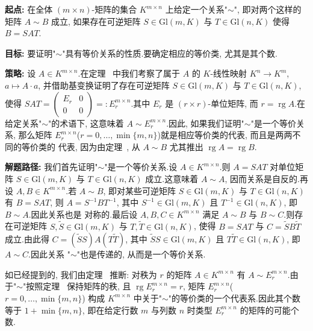 \noindent\textbf{起点:} 在全体 $(m \times n)$-矩阵的集合 $K^{m \times n}$ 上给定一个关系"$\sim$",
即对两个这样的矩阵 $A \sim B$ 成立, 如果存在可逆矩阵 $S \in \mathrm{Gl}(m, K)$ 与
$T \in \mathrm{Gl}(n, K)$ 使得 $B = SAT$.

\noindent\textbf{目标:} 要证明"$\sim$"具有等价关系的性质.要确定相应的等价类, 尤其是其个数.

\noindent\textbf{策略:} 设 $A \in K^{m \times n}$.在定理~ 中我们考察了属于 $A$ 的
$K$-线性映射 $K^n \longrightarrow K^m$, $a \longmapsto A \cdot a$, 并借助基变换证明了存在可逆矩阵
$S \in \mathrm{Gl}(m, K)$ 与 $T \in \mathrm{Gl}(n, K)$, 使得
$SAT = \begin{pmatrix} E_r & 0 \\ 0 & 0 \end{pmatrix} =: E_r^{m \times n}$.其中 $E_r$ 是
$(r \times r)$-单位矩阵, 而 $r = \operatorname{rg} A$.在给定关系"$\sim$"的术语下, 这意味着
$A \sim E_r^{m \times n}$.因此, 如果我们证明"$\sim$"是一个等价关系, 那么矩阵
$E_r^{m \times n}$($r = 0, \ldots, \min\{m, n\}$)就是相应等价类的代表, 而且是两两不同的等价类的
代表, 因为由定理~, 从 $A \sim B$ 尤其推出 $\operatorname{rg} A = \operatorname{rg} B$.

\noindent\textbf{解题路径:} 我们首先证明"$\sim$"是一个等价关系.设 $A \in K^{m \times n}$.则
$A = SAT$ 对单位矩阵 $S \in \mathrm{Gl}(m, K)$ 与 $T \in \mathrm{Gl}(n, K)$ 成立.这意味着
$A \sim A$, 因而关系是自反的.再设 $A, B \in K^{m \times n}$.若 $A \sim B$, 即对某些可逆矩阵
$S \in \mathrm{Gl}(m, K)$ 与 $T \in \mathrm{Gl}(n, K)$ 有 $B = SAT$, 则 $A = S^{-1}BT^{-1}$,
其中 $S^{-1} \in \mathrm{Gl}(m, K)$ 且 $T^{-1} \in \mathrm{Gl}(n, K)$, 即 $B \sim A$.因此关系也是
对称的.最后设 $A, B, C \in K^{m \times n}$ 满足 $A \sim B$ 与 $B \sim C$.则存在可逆矩阵
$S, \tilde{S} \in \mathrm{Gl}(m, K)$ 与 $T, \tilde{T} \in \mathrm{Gl}(n, K)$, 使得 $B = SAT$ 与
$C = \tilde{S}B\tilde{T}$ 成立.由此得 $C = (\tilde{S}S)A(T\tilde{T})$, 其中
$\tilde{S}S \in \mathrm{Gl}(m, K)$ 且 $T\tilde{T} \in \mathrm{Gl}(n, K)$, 即 $A \sim C$.因此关系
"$\sim$"也是传递的, 从而是一个等价关系.

如已经提到的, 我们由定理~ 推断: 对秩为 $r$ 的矩阵 $A \in K^{m \times n}$ 有
$A \sim E_r^{m \times n}$.由于"$\sim$"按照定理~ 保持矩阵的秩, 且
$\operatorname{rg} E_r^{m \times n} = r$, 矩阵 $E_r^{m \times n}$($r = 0, \ldots, \min\{m, n\}$)
构成 $K^{m \times n}$ 中关于"$\sim$"的等价类的一个代表系.因此其个数等于 $1 + \min\{m, n\}$,
即在给定行数 $m$ 与列数 $n$ 时类型 $E_r^{m \times n}$ 的矩阵的可能个数.

